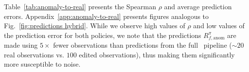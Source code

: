 Table~\ref{tab:anomaly-to-real} presents the Spearman $\rho$ and average prediction errors. Appendix~\ref{app:anomaly-to-real} presents figures analogous to Fig.~\ref{fig:predictions hybrid}. While we observe high values of $\rho$ and low values of the prediction error for both policies, we note that the predictions $R_{f, \text{anom}}^\pi$ are made using $5\times$ fewer observations than predictions from the full \redit~pipeline ($\sim 20$ real observations vs. $100$ edited observations), thus making them significantly more susceptible to noise. 

\begin{table}[t]
\centering
{}
\caption{Evaluating predictions of success rates made from anomaly rates computed using real observations.}
\label{tab:anomaly-to-real}
\vspace{-5pt}
\end{table}


